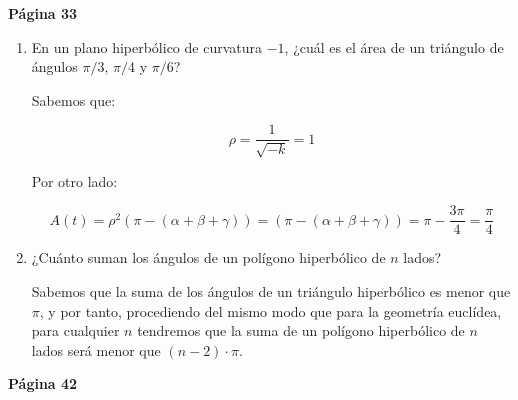 \vspace{0.5cm}

\textbf{Página 33}

\begin{enumerate}
\item En un plano hiperbólico de curvatura $-1$, ¿cuál es el área de
un triángulo de ángulos $\pi/3$,  $\pi/4$ y  $\pi/6$?

Sabemos que:

\[
\rho = \frac{1}{\sqrt{-k}} = 1
\] 

Por otro lado:

\[
A(t)=\rho^2(\pi -(\alpha+\beta+\gamma)) = (\pi -(\alpha+\beta+\gamma)) = \pi - \frac{3\pi}{4} =\frac{\pi}{4}
\]

\item  ¿Cuánto suman los ángulos de un polígono hiperbólico de $n$ lados?

Sabemos que la suma de los ángulos de un triángulo hiperbólico es menor que $\pi$, y por tanto, procediendo del mismo modo que para la geometría euclídea, para cualquier $n$ tendremos que la suma de un polígono hiperbólico de $n$ lados será menor que $(n-2)\cdot\pi$.


\end{enumerate}

\vspace{0.5cm}


\textbf{Página 42}

